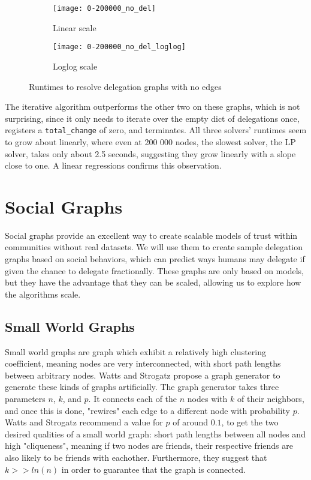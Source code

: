 \begin{figure}[t]
    \centering
    \begin{subfigure}[t]{0.45\textwidth}
    	\centering
    	\texttt{[image: 0-200000\_no\_del]}
    	\caption{Linear scale}
    	\label{subfig:no-del-linear}
    \end{subfigure}
    \hfill
    \begin{subfigure}[t]{0.45\textwidth}
        \centering
        \texttt{[image: 0-200000\_no\_del\_loglog]}
        \caption{Loglog scale}
         \label{subfig:no-del-loglog}
    \end{subfigure}
    \caption{Runtimes to resolve delegation graphs with no edges}
    \label{fig:no_del}
\end{figure}


The iterative algorithm outperforms the other two on these graphs, which is not surprising, since it only needs to iterate over the empty dict of delegations once, registers a \texttt{total\_change} of zero, and terminates. All three solvers' runtimes seem to grow about linearly, where even at 200 000 nodes, the slowest solver, the LP solver, takes only about 2.5 seconds, suggesting they grow linearly with a slope close to one. A linear regressions confirms this observation. 

\section{Social Graphs}
\label{sec:social_graphs}

Social graphs provide an excellent way to create scalable models of trust within communities without real datasets. We will use them to create sample delegation graphs based on social behaviors, which can predict ways humans may delegate if given the chance to delegate fractionally. These graphs are only based on models, but they have the advantage that they can be scaled, allowing us to explore how the algorithms scale.

\subsection{Small World Graphs}

Small world graphs are graph which exhibit a relatively high clustering coefficient, meaning nodes are very interconnected, with short path lengths between arbitrary nodes. Watts and Strogatz propose a graph generator to generate these kinds of graphs artificially. \cite{wattsCollectiveDynamicsSmallworld1998a} The graph generator takes three parameters $n$, $k$, and $p$. It connects each of the $n$ nodes with $k$ of their neighbors, and once this is done, "rewires" each edge to a different node with probability $p$. Watts and Strogatz recommend a value for $p$ of around $0.1$, to get the two desired qualities of a small world graph: short path lengths between all nodes and high "cliqueness", meaning if two nodes are friends, their respective friends are also likely to be friends with eachother. Furthermore, they suggest that $k >> ln(n)$ in order to guarantee that the graph is connected. 

